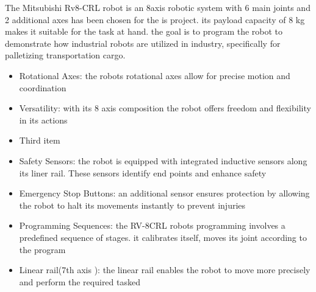The Mitsubishi Rv8-CRL robot is an 8axis robotic system with 6 main joints and 2 additional axes has been chosen for the is project. its payload capacity of 8 kg makes it suitable for the task at hand. the goal is to program the robot to demonstrate how 
industrial robots are utilized in industry, specifically for palletizing transportation cargo.

\begin{itemize}
    \item Rotational Axes: the robots rotational axes allow for precise motion and coordination
    \item Versatility: with its 8 axis composition the robot offers freedom and flexibility in its actions 
    \item Third item
    \item Safety Sensors: the robot is equipped with integrated inductive sensors along its liner rail. These sensors identify end points and enhance safety
    \item 	Emergency Stop Buttons: an additional sensor ensures protection by allowing the robot to halt its movements instantly to prevent injuries
    \item Programming Sequences: the RV-8CRL robots programming involves a predefined sequence of stages. it calibrates itself, moves its joint according to the program
    \item Linear rail(7th axis ): the linear rail enables the robot to move more precisely and perform the required tasked
\end{itemize}
